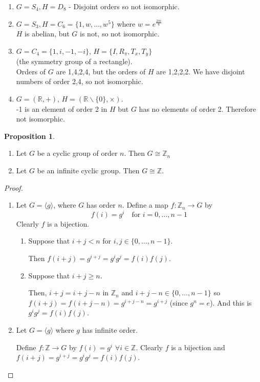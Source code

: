 \documentclass{article}
\theoremstyle{definition} \newtheorem*{definition}{Definition}
\newtheorem{proposition}[theorem]{Proposition}
\newcommand{\reals}{\mathbb{R}} \newcommand{\rationals}{\mathbb{Q}}
\newcommand{\but}[2]{#1 \backslash \{#2\}} \newcommand{\A}{\mathcal{A}}
\newcommand{\ism}{\cong} \newcommand{\elemt}[2]{#1_{{#2}\sigma(#2)}}
\begin{document}
\begin{exmps}\hfill \begin{enumerate} \item $G=S_4, H=D_8$ - Disjoint orders so
        not isomorphic.  \item $G=S_3, H=C_6=\{1,w,\ldots,w^5\}$ where
        $w=e^{\frac{2 \pi i}{6}}$\\ $H$ is abelian, but $G$ is not, so not
      isomorphic.  \item $G=C_4=\{1,i,-1,-i\}$, $H=\{I,R_\pi,T_x,T_y\}$ \\(the
        symmetry group of a rectangle). \\ Orders of $G$ are 1,4,2,4, but the
        orders of $H$ are 1,2,2,2. We have disjoint numbers of order 2,4, so
        not isomorphic.  \item $G=(\mathbb{R}, +)$, $H=(\but{\reals}{0},
          \times).$\\ -1 is an element of order 2 in $H$ but $G$ has no
          elements of order 2. Therefore not isomorphic.\\ \end{enumerate}
    \end{exmps}

\begin{proposition}\hfill \begin{enumerate} \item Let $G$ be a cyclic group of
        order $n$. Then $G \ism \mathbb{Z}_n$ \item Let $G$ be an infinite
          cyclic group. Then $G \ism \mathbb{Z}$.  \end{enumerate}
    \end{proposition}

\begin{proof}\hfill \begin{enumerate} \item Let $G=\langle g \rangle$, where
          $G$ has order $n$. Define a map $f : \mathbb{Z}_n \rightarrow G$ by
          $$f(i)=g^i \quad \text{for } i=0,\ldots,n-1$$ Clearly $f$ is a
          bijection.  \begin{enumerate} \item Suppose that $i+j<n$ for $i,j \in
              \{0,\ldots,n-1\}.$ 
            
              Then $f(i+j)=g^{i+j}=g^i g^j = f(i)f(j)$.
            \item Suppose that $i+j \geq n$. 
              
              Then, $i+j = i+j-n$ in  $\mathbb{Z}_n$ and $i+j-n \in \{0,\ldots,n-1\}$ so
              $f(i+j)=f(i+j-n)=g^{i+j-n}=g^{i+j}$ (since $g^n=e$).  And this is
            $g^i g^j = f(i) f(j)$.  \end{enumerate} \item Let $G=\langle g
          \rangle$ where $g$ has infinite order. 
          
          Define $f : \mathbb{Z}
          \rightarrow G$ by $f(i)=g^i$ $\forall i \in \mathbb{Z}$. Clearly $f$
          is a bijection and $f(i+j)=g^{i+j}=g^i g^j = f(i) f(j)$.
      \end{enumerate} \end{proof}
\end{document}
